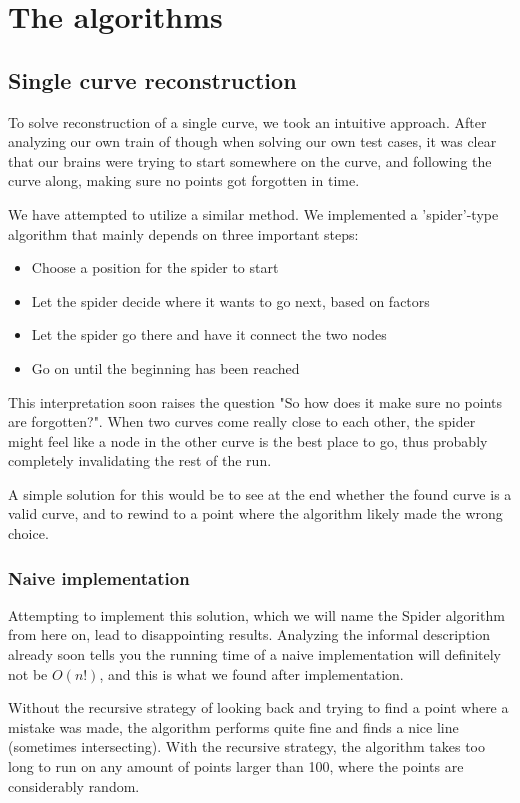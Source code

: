 \documentclass[11pt]{article}
\begin{document}
\section{The algorithms}
\label{se:algorithms}

\subsection{Single curve reconstruction}
To solve reconstruction of a single curve, we took an intuitive approach. After analyzing our own train of though when solving our own test cases, it was clear that our brains were trying to start somewhere on the curve, and following the curve along, making sure no points got forgotten in time.

We have attempted to utilize a similar method. We implemented a 'spider'-type algorithm that mainly depends on three important steps:
\begin{itemize}
\item Choose a position for the spider to start
\item Let the spider decide where it wants to go next, based on factors
\item Let the spider go there and have it connect the two nodes
\item Go on until the beginning has been reached
\end{itemize}

This interpretation soon raises the question "So how does it make sure no points are forgotten?".
When two curves come really close to each other, the spider might feel like a node in the other curve is the best place to go, thus probably completely invalidating the rest of the run.

A simple solution for this would be to see at the end whether the found curve is a valid curve, and to rewind to a point where the algorithm likely made the wrong choice.

\subsubsection{Naive implementation} 

Attempting to implement this solution, which we will name the Spider algorithm from here on, lead to disappointing results. Analyzing the informal description already soon tells you the running time of a naive implementation will definitely not be $O(n!)$, and this is what we found after implementation.

Without the recursive strategy of looking back and trying to find a point where a mistake was made, the algorithm performs quite fine and finds a nice line (sometimes intersecting). With the recursive strategy, the algorithm takes too long to run on any amount of points larger than 100, where the points are considerably random.
\end{document}
